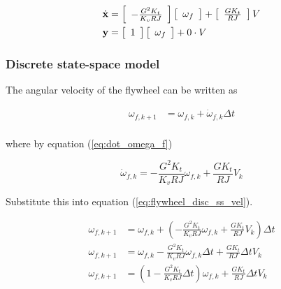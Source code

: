 \begin{align}
  \dot{\mathbf{x}} &= \left[
  \begin{array}{c}
    -\frac{G^2 K_t}{K_v RJ}
  \end{array}
  \right] \left[
  \begin{array}{c}
    \omega_f \\
  \end{array}
  \right] + \left[
  \begin{array}{c}
    \frac{G K_t}{RJ}
  \end{array}
  \right] V \\
  \mathbf{y} &= \left[
  \begin{array}{c}
    1
  \end{array}
  \right] \left[
  \begin{array}{c}
    \omega_f \\
  \end{array}
  \right] + 0 \cdot V
\end{align}

\subsubsection{Discrete state-space model}

The angular velocity of the flywheel can be written as

\begin{align}
  \omega_{f,k+1} &= \omega_{f,k} + \dot{\omega}_{f,k} \Delta t
    \label{eq:flywheel_disc_ss_vel} \\
\end{align}

where by equation (\ref{eq:dot_omega_f})

\begin{equation*}
  \dot{\omega}_{f,k} = -\frac{G^2 K_t}{K_v RJ} \omega_{f,k} +
    \frac{G K_t}{RJ} V_k
\end{equation*}

Substitute this into equation (\ref{eq:flywheel_disc_ss_vel}).

\begin{align}
  \omega_{f,k+1} &= \omega_{f,k} + \left(-\frac{G^2 K_t}{K_v RJ} \omega_{f,k} +
    \frac{G K_t}{RJ} V_k\right) \Delta t \nonumber \\
  \omega_{f,k+1} &= \omega_{f,k} - \frac{G^2 K_t}{K_v RJ} \omega_{f,k}
    \Delta t + \frac{G K_t}{RJ} \Delta t V_k \nonumber \\
  \omega_{f,k+1} &= \left(1 - \frac{G^2 K_t}{K_v RJ} \Delta t\right)
    \omega_{f,k} + \frac{G K_t}{RJ} \Delta t V_k \nonumber \\
\end{align}

